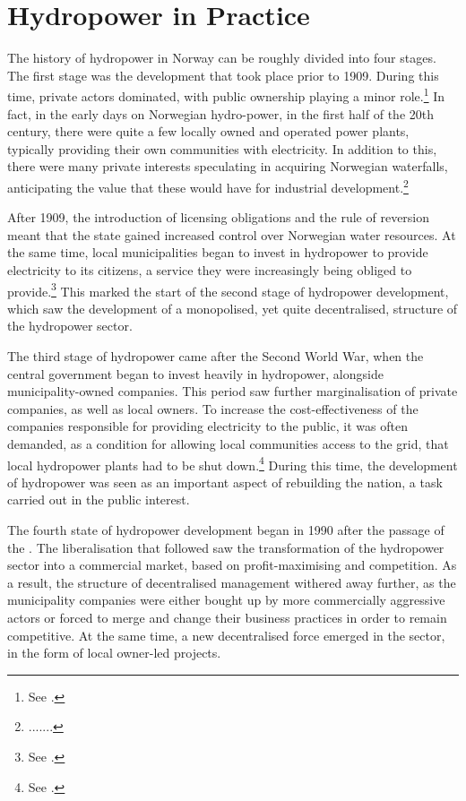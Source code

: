 \section{Hydropower in Practice}

The history of hydropower in Norway can be roughly divided into four stages. The first stage was the development that took place prior to 1909. During this time, private actors dominated, with public ownership playing a minor role.\footnote{See \cite{otprp61}.} In fact, in the early days on Norwegian hydro-power, in the first half of the 20th century, there were quite a few locally owned and operated power plants, typically providing their own communities with electricity. In addition to this, there were many private interests speculating in acquiring Norwegian waterfalls, anticipating the value that these would have for industrial development.\footnote{.......}

After 1909, the introduction of licensing obligations and the rule of reversion meant that the state gained increased control over Norwegian water resources. At the same time, local municipalities began to invest in hydropower to provide electricity to its citizens, a service they were increasingly being obliged to provide.\footnote{See \cite{otprp61}.} This marked the start of the second stage of hydropower development, which saw the development of a monopolised, yet quite decentralised, structure of the hydropower sector.

The third stage of hydropower came after the Second World War, when the central government began to invest heavily in hydropower, alongside municipality-owned companies. This period saw further marginalisation of private companies, as well as local owners. To increase the cost-effectiveness of the companies responsible for providing electricity to the public, it was often demanded, as a condition for allowing local communities access to the grid, that local hydropower plants had to be shut down.\footnote{See \cite[p.111]{hindrum94}.} During this time, the development of hydropower was seen as an important aspect of rebuilding the nation, a task carried out in the public interest.

The fourth state of hydropower development began in 1990 after the passage of the \cite{ea90}. The liberalisation that followed saw the transformation of the hydropower sector into a commercial market, based on profit-maximising and competition. As a result, the structure of decentralised management withered away further, as the municipality companies were either bought up by more commercially aggressive actors or forced to merge and change their business practices in order to remain competitive. At the same time, a new decentralised force emerged in the sector, in the form of local owner-led projects. 

